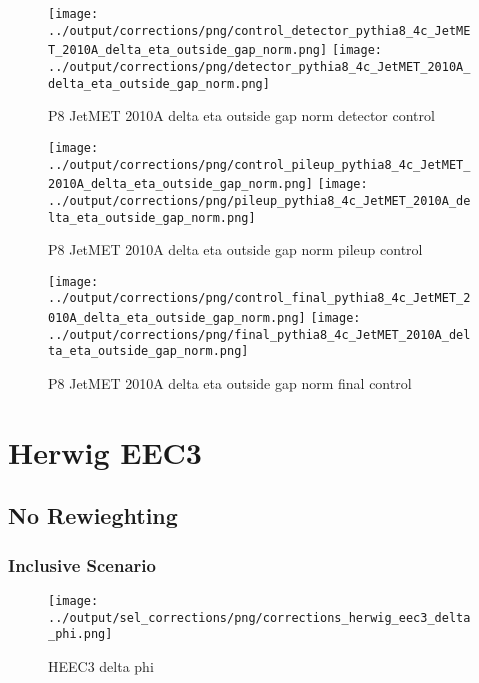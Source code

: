 \documentclass[11pt]{book}
\begin{document}
\begin{figure}[ht]
\centering
\texttt{[image: ../output/corrections/png/control\_detector\_pythia8\_4c\_JetMET\_2010A\_delta\_eta\_outside\_gap\_norm.png]}
\texttt{[image: ../output/corrections/png/detector\_pythia8\_4c\_JetMET\_2010A\_delta\_eta\_outside\_gap\_norm.png]}
\caption{P8 JetMET 2010A delta eta outside gap norm detector control}
\label{fig:p8_JetMET_2010A_delta_eta_outside_gap_norm_detector_control}
\end{figure}

\begin{figure}[ht]
\centering
\texttt{[image: ../output/corrections/png/control\_pileup\_pythia8\_4c\_JetMET\_2010A\_delta\_eta\_outside\_gap\_norm.png]}
\texttt{[image: ../output/corrections/png/pileup\_pythia8\_4c\_JetMET\_2010A\_delta\_eta\_outside\_gap\_norm.png]}
\caption{P8 JetMET 2010A delta eta outside gap norm pileup control}
\label{fig:p8_JetMET_2010A_delta_eta_outside_gap_norm_pileup_control}
\end{figure}


\begin{figure}[ht]
\centering
\texttt{[image: ../output/corrections/png/control\_final\_pythia8\_4c\_JetMET\_2010A\_delta\_eta\_outside\_gap\_norm.png]}
\texttt{[image: ../output/corrections/png/final\_pythia8\_4c\_JetMET\_2010A\_delta\_eta\_outside\_gap\_norm.png]}
\caption{P8 JetMET 2010A delta eta outside gap norm final control}
\label{fig:p8_JetMET_2010A_delta_eta_outside_gap_norm_final_control}
\end{figure}


\cleardoublepage

\chapter{Herwig EEC3}

\section{No Rewieghting}

\subsection{Inclusive Scenario}
\begin{figure}[ht]
\centering
\texttt{[image: ../output/sel\_corrections/png/corrections\_herwig\_eec3\_delta\_phi.png]}
\caption{HEEC3 delta phi}
\label{fig:HEEC3_delta_phi}
\end{figure}
\end{document}

